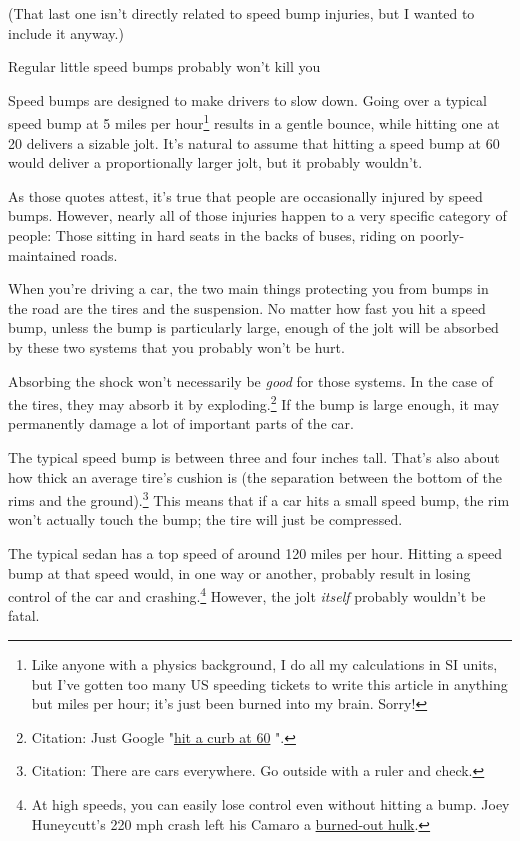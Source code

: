 {{(That last one isn't directly related to speed bump injuries, but I wanted to include it anyway.)}

{Regular little speed bumps probably won't kill you}

{Speed bumps are designed to make drivers to slow down. Going over a typical speed bump at 5 miles per hour{\footnote{Like anyone with a physics background, I do all my calculations in SI units, but I've gotten too many US speeding tickets to write this article in anything but miles per hour; it's just been burned into my brain. Sorry!} } results in a gentle bounce, while hitting one at 20 delivers a sizable jolt. It's natural to assume that hitting a speed bump at 60 would deliver a proportionally larger jolt, but it probably wouldn't.}

{As those quotes attest, it's true that people are occasionally injured by speed bumps. However, nearly all of those injuries happen to a very specific category of people: Those sitting in hard seats in the backs of buses, riding on poorly-maintained roads.}

{When you're driving a car, the two main things protecting you from bumps in the road are the tires and the suspension. No matter how fast you hit a speed bump, unless the bump is particularly large, enough of the jolt will be absorbed by these two systems that you probably won't be hurt.}

{Absorbing the shock won't necessarily be \emph{good} for those systems. In the case of the tires, they may absorb it by exploding.{\footnote{Citation: Just Google "\href{http://www.google.com/search?q=hit+a+curb+at+60}{hit a curb at 60} ".} } If the bump is large enough, it may permanently damage a lot of important parts of the car.}

{The typical speed bump is between three and four inches tall. That's also about how thick an average tire's cushion is (the separation between the bottom of the rims and the ground).{\footnote{Citation: There are cars everywhere. Go outside with a ruler and check.} } This means that if a car hits a small speed bump, the rim won't actually touch the bump; the tire will just be compressed.}

{The typical sedan has a top speed of around 120 miles per hour. Hitting a speed bump at that speed would, in one way or another, probably result in losing control of the car and crashing.{\footnote{At high speeds, you can easily lose control even without hitting a bump. Joey Huneycutt's 220 mph crash left his Camaro a \href{http://gmauthority.com/blog/2013/03/worlds-fastest-camaro-crashes-at-220-mph-during-texas-mile-run/}{burned-out hulk}.} } However, the jolt \emph{itself} probably wouldn't be fatal.}

}
